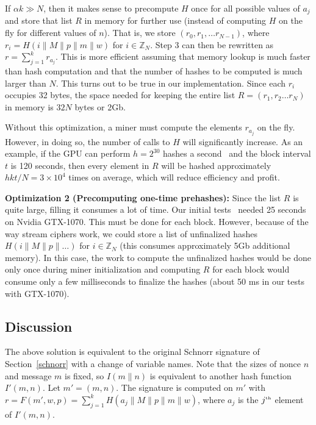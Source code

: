 \documentclass[runningheads]{llncs}
\begin{document}
If $\alpha k \gg N$, then it makes sense to precompute $H$ once for all possible values of $a_j$ and store that list $R$ in memory for further use (instead of computing $H$ on the fly for different values of $n$). That is, we store $(r_0, r_1, \ldots r_{N-1})$, where $r_i = H(i\|M\|{p}\|m\|w)$ for $i\in \mathbb{Z}_N$. Step 3 can then be rewritten as $r = \sum^{k}_{j=1}r_{a_j}$. This is more efficient assuming that memory lookup is much faster than hash computation and that the number of hashes to be computed is much larger than $N$. 
This turns out to be true in our implementation.
Since each $r_i$ occupies 32 bytes, the space needed for keeping the entire list $R = (r_1, r_2\ldots r_N)$ in memory is $32N$ bytes or 2Gb. 

Without this optimization, a miner must compute the elements $r_{a_j}$ on the fly. However, in doing so, the number of calls to $H$ will significantly increase. As an example, if the GPU can perform $h = 2^{30}$ hashes a second~\cite{ref} and the block interval $t$ is 120 seconds, then every element in $R$ will be hashed approximately $hkt/N = 3\times 10^4$ times on average, which will reduce efficiency and profit.

\textbf{Optimization 2 (Precomputing one-time prehashes):} Since the list $R$ is quite large, filling it consumes a lot of time. Our initial tests~\cite{impl} needed 25 seconds on Nvidia GTX-1070.
This must be done for each block. However, because of the way stream ciphers work, we could store a list of unfinalized hashes 
$H(i\|M\|{p}\|\ldots)$ for $i\in \mathbb{Z}_N$ (this consumes approximately 5Gb additional memory).
In this case, the work to compute the unfinalized hashes would be done only once during miner initialization and computing $R$ for each block would consume only a few milliseconds to finalize the hashes (about 50 ms in our tests with GTX-1070).


\subsection{Discussion}
\label{impl}
The above solution is equivalent to the original Schnorr signature of Section~\ref{schnorr} with a change of variable names. 
Note that the sizes of nonce $n$ and message $m$ is fixed, so $I(m\|n)$ is equivalent to another hash function ${I}'(m, n)$.
Let ${m'} = (m, n)$. The signature is computed on ${m'}$ with 
$r = F({m'},w,{p}) = \sum^{k}_{j=1}H(a_j\|M\|{p}\|m\|w)$, where $a_j$ is the $j^{\tiny\mbox{th}}$ element of ${I'}(m,n)$.
\end{document}
